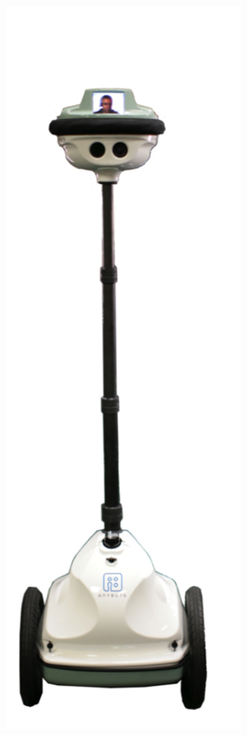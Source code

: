 \begin{figure}[ht]
\begin{minipage}[t]{.25\linewidth}
      \label{fig:y} 
   \end{minipage}%
   \hfill
   \begin{minipage}[t]{.25\linewidth} 
      \centering 
      \includegraphics[width=0.7\textwidth]{bilder/grundlagen/4.png} 

\end{minipage}
\end{figure}
